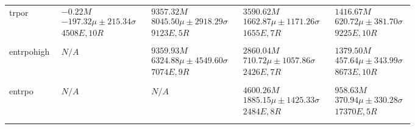 \begin{tabular}{|l|p{6cm}|p{6cm}|p{6cm}|p{6cm}|}
trpor & $\begin{array}{c} -0.22M \\ -197.32\mu \pm 215.34\sigma \\ 4508E, 10R \end{array}$ & $\begin{array}{c} 9357.32M \\ 8045.50\mu \pm 2918.29\sigma \\ 9123E, 5R \end{array}$ & $\begin{array}{c} 3590.62M \\ 1662.87\mu \pm 1171.26\sigma \\ 1655E, 7R \end{array}$ & $\begin{array}{c} 1416.67M \\ 620.72\mu \pm 381.70\sigma \\ 9225E, 10R \end{array}$ \\ \\ \hline
entrpohigh & $\begin{array}{c} N/A \end{array}$ & $\begin{array}{c} 9359.93M \\ 6324.88\mu \pm 4549.60\sigma \\ 7074E, 9R \end{array}$ & $\begin{array}{c} 2860.04M \\ 710.72\mu \pm 1057.86\sigma \\ 2426E, 7R \end{array}$ & $\begin{array}{c} 1379.50M \\ 457.64\mu \pm 343.99\sigma \\ 8673E, 10R \end{array}$ \\ \\ \hline
entrpo & $\begin{array}{c} N/A \end{array}$ & $\begin{array}{c} N/A \end{array}$ & $\begin{array}{c} 4600.26M \\ 1885.15\mu \pm 1425.33\sigma \\ 2484E, 8R \end{array}$ & $\begin{array}{c} 958.63M \\ 370.94\mu \pm 330.28\sigma \\ 17370E, 5R \end{array}$ \\ \\ \hline

\end{tabular}
